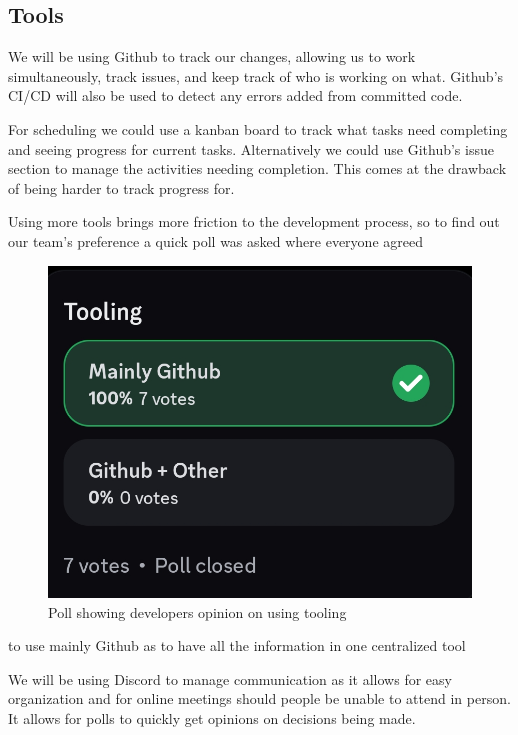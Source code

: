 \subsection{Tools}
We will be using Github to track our changes, allowing us to work simultaneously, 
track issues, and keep track of who is working on what. 
Github's CI/CD will also be used to detect any errors added from committed code.
\par
For scheduling we could use a kanban board to track what tasks need completing and seeing
progress for current tasks. Alternatively we could use Github's issue section to manage
the activities needing completion. This comes at the drawback of being harder to track progress
for.
\par
Using more tools brings more friction to the development process, so to find out our team's
preference a quick poll was asked where everyone agreed %
\begin{figure}[h!]
    \centering
    \includegraphics[width=0.5\linewidth]{toolingPoll}
    \caption{Poll showing developers opinion on using tooling}
    \label{fig:toolingPoll}
\end{figure}
to use mainly Github as to have all the information in one centralized tool

\par
We will be using Discord to manage communication as it allows for easy organization and
for online meetings should people be unable to attend in person. It allows for polls to
quickly get opinions on decisions being made.
